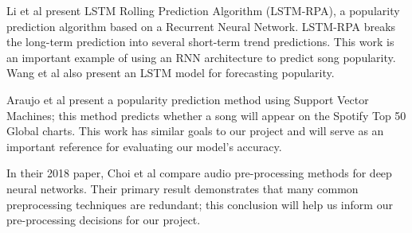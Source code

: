\documentclass[11pt]{article}
\begin{document}
% 


Li et al \cite{li_lstm-rpa_2021} present LSTM Rolling Prediction Algorithm (LSTM-RPA), a popularity prediction algorithm based on a Recurrent Neural Network. LSTM-RPA breaks the long-term prediction into several short-term trend predictions. This work is an important example of using an RNN architecture to predict song popularity. Wang et al \cite{wang_music_2019} also present an LSTM model for forecasting popularity.
    
Araujo et al \cite{araujo_predicting_2019} present a popularity prediction method using Support Vector Machines; this method predicts whether a song will appear on the Spotify Top 50 Global charts. This work has similar goals to our project and will serve as an important reference for evaluating our model’s accuracy.

In their 2018 paper, Choi et al \cite{choi_comparison_2018} compare audio pre-processing methods for deep neural networks. Their primary result demonstrates that many common preprocessing techniques are redundant; this conclusion will help us inform our pre-processing decisions for our project.

% 
\end{document}
